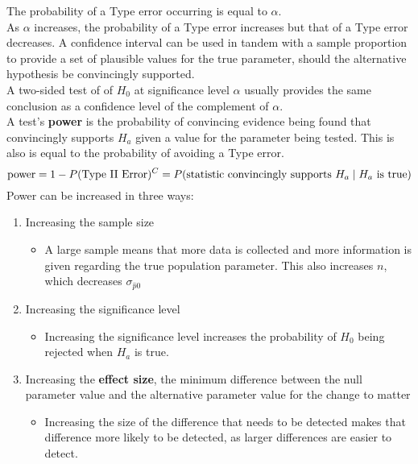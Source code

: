 \documentclass[../AP_Statistics.tex]{subfiles}
\begin{document}
		The probability of a Type  error occurring is equal to $\alpha$. \\
		As $\alpha$ increases, the probability of a Type  error increases but that of a Type  error decreases.
		A confidence interval can be used in tandem with a sample proportion to provide a set of plausible values for the true parameter, should the alternative hypothesis be convincingly supported. \\
		A two-sided test of of $H_0$ at significance level $\alpha$ usually provides the same conclusion as a confidence level of the complement of $\alpha$. \\
		A test's \textbf{power} is the probability of convincing evidence being found that convincingly supports $H_a$ given a value for the parameter being tested. This is also is equal to the probability of avoiding a Type  error. 
		$$\mathrm{power} = 1 - P(\text{Type \Roman{2} Error})^C = P(\text{statistic convincingly supports } H_a \mid H_a \text{ is true})$$
		Power can be increased in three ways:
		\begin{enumerate}
			\item Increasing the sample size
				\begin{itemize}
					\item A large sample means that more data is collected and more information is given regarding the true population parameter. This also increases $n$, which decreases $\sigma_{\hat{p}0}$
				\end{itemize}
			\item Increasing the significance level
				\begin{itemize}
					\item Increasing the significance level increases the probability of $H_0$ being rejected when $H_a$ is true.
				\end{itemize}
			\item Increasing the \textbf{effect size}, the minimum difference between the null parameter value and the alternative parameter value for the change to matter
				\begin{itemize}
					\item Increasing the size of the difference that needs to be detected makes that difference more likely to be detected, as larger differences are easier to detect.
				\end{itemize}
		\end{enumerate}
\end{document}
